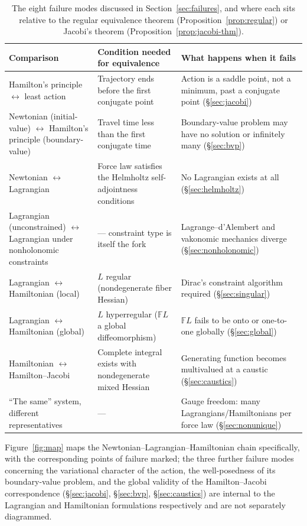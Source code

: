 \documentclass[11pt]{article}
\newcommand{\FL}{\mathbb{F}L}
\begin{document}
\begin{table}[htbp]
\centering
\small
\begin{tabular}{@{}p{2.6cm}p{4.4cm}p{5.6cm}@{}}
\toprule
\textbf{Comparison} & \textbf{Condition needed for equivalence} & \textbf{What happens when it fails} \\
\midrule
Hamilton's principle $\leftrightarrow$ least action & Trajectory ends before the first conjugate point & Action is a saddle point, not a minimum, past a conjugate point (\S\ref{sec:jacobi}) \\
Newtonian (initial-value) $\leftrightarrow$ Hamilton's principle (boundary-value) & Travel time less than the first conjugate time & Boundary-value problem may have no solution or infinitely many (\S\ref{sec:bvp}) \\
Newtonian $\leftrightarrow$ Lagrangian & Force law satisfies the Helmholtz self-adjointness conditions & No Lagrangian exists at all (\S\ref{sec:helmholtz}) \\
Lagrangian (unconstrained) $\leftrightarrow$ Lagrangian under nonholonomic constraints & --- constraint type is itself the fork & Lagrange--d'Alembert and vakonomic mechanics diverge (\S\ref{sec:nonholonomic}) \\
Lagrangian $\leftrightarrow$ Hamiltonian (local) & $L$ regular (nondegenerate fiber Hessian) & Dirac's constraint algorithm required (\S\ref{sec:singular}) \\
Lagrangian $\leftrightarrow$ Hamiltonian (global) & $L$ hyperregular ($\FL$ a global diffeomorphism) & $\FL$ fails to be onto or one-to-one globally (\S\ref{sec:global}) \\
Hamiltonian $\leftrightarrow$ Hamilton--Jacobi & Complete integral exists with nondegenerate mixed Hessian & Generating function becomes multivalued at a caustic (\S\ref{sec:caustics}) \\
``The same'' system, different representatives & --- & Gauge freedom: many Lagrangians/Hamiltonians per force law (\S\ref{sec:nonunique}) \\
\bottomrule
\end{tabular}
\caption{The eight failure modes discussed in Section~\ref{sec:failures}, and where each sits relative to the regular equivalence theorem (Proposition~\ref{prop:regular}) or Jacobi's theorem (Proposition~\ref{prop:jacobi-thm}).}
\label{tab:summary}
\end{table}

Figure~\ref{fig:map} maps the Newtonian--Lagrangian--Hamiltonian chain specifically, with the corresponding points of failure marked; the three further failure modes concerning the variational character of the action, the well-posedness of its boundary-value problem, and the global validity of the Hamilton--Jacobi correspondence (\S\ref{sec:jacobi}, \S\ref{sec:bvp}, \S\ref{sec:caustics}) are internal to the Lagrangian and Hamiltonian formulations respectively and are not separately diagrammed.
\end{document}
